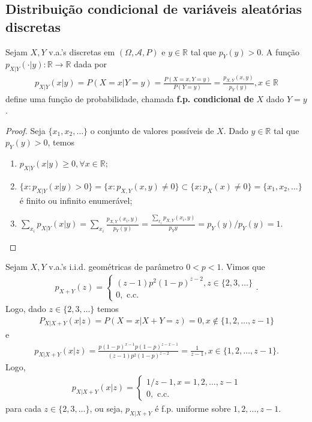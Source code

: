 \documentclass[../Notas.tex]{subfiles}
\begin{document}
\subsection{Distribuição condicional de variáveis aleatórias discretas}
\begin{proposition}
Sejam $X,Y$ v.a.'s discretas em $(\Omega, \mathcal{A}, P)$ e $y\in\mathbb{R}$ tal que $p_Y(y) > 0$. A função $p_{X|Y}(\cdot|y):\mathbb{R}\to\mathbb{R}$ dada por
\begin{align*}
    p_{X|Y}(x|y) = P(X=x|Y=y) = \frac{ P(X=x, Y=y) }{P(Y=y)} = \frac{p_{X,Y}(x,y)}{p_{Y}(y)}, x\in\mathbb{R}
\end{align*}
define uma função de probabilidade, chamada \textbf{f.p. condicional de } $X$ dado $Y=y$.
\end{proposition}

\begin{proof}
    Seja $\{ x_1, x_2, \dots\}$ o conjunto de valores possíveis de $X$. Dado $y\in\mathbb{R}$ tal que $p_Y(y)>0$, temos
    \begin{enumerate}
        \item $p_{X|Y}(x|y) \geq 0, \forall x\in\mathbb{R}$;
        \item $\{ x : p_{X|Y}(x|y) > 0 \} = \{ x : p_{X,Y}(x,y)\neq 0 \}\subset\{ x : p_X(x)\neq 0 \} = \{x_1, x_2, \dots\}$ é finito ou infinito enumerável;
        \item $\displaystyle{ \sum_{x_i}p_{X|Y}(x|y) = \sum_{x_i}\frac{ p_{X,Y}(x_i,y) }{p_Y(y)} = \frac{ \sum_{x_i}p_{X,Y}(x_i,y) }{p_{Y}y} = p_Y(y)/p_Y(y) = 1 }$.
    \end{enumerate}
\end{proof}

\begin{example}
Sejam $X, Y$ v.a.'s i.i.d. geométricas de parâmetro $0 < p < 1$. Vimos que
\begin{align*}
    p_{X+Y}(z) = \begin{cases}
    (z-1)p^2(1-p)^{z-2}, z\in\{2,3,\dots\} \\
    0, \text{ c.c.}
    \end{cases}.
\end{align*}
Logo, dado $z\in\{2, 3, \dots\}$ temos
\begin{align*}
    P_{X|X+Y}(x|z) = P(X=x|X+Y=z) = 0, x\notin \{1,2,\dots,z-1\}
\end{align*}
e
\begin{align*}
    p_{X|X+Y}(x|z) = \frac{ p(1-p)^{x-1}p(1-p)^{z-x-1} }{ (z-1)p^2(1-p)^{z-2} } = \frac{1}{z-1}, x\in\{ 1,2,\dots,z-1 \}.
\end{align*}
Logo,
\begin{align*}
    p_{X|X+Y}(x|z) = \begin{cases}
    1/z-1, x = 1,2,\dots,z-1 \\
    0, \text{ c.c.}
    \end{cases}
\end{align*}
para cada $z\in\{2,3,\dots\}$, ou seja, $p_{X|X+Y}$ é f.p. uniforme sobre ${1, 2, \dots, z-1}$.
\end{example}
\end{document}
